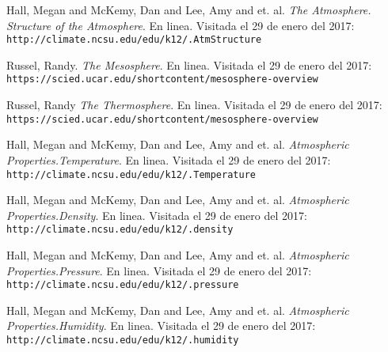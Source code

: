 \documentclass[12pt]{article}
\begin{document}
\newpage
\begin{thebibliography}{9}
Hall, Megan and McKemy, Dan and Lee, Amy and et. al.
\textit{The Atmosphere. Structure of the Atmosphere}. En linea. Visitada el 29 de enero del 2017:
\\\texttt{http://climate.ncsu.edu/edu/k12/.AtmStructure}
 
Russel, Randy.
\textit{The Mesosphere}. En linea. Visitada el 29 de enero del 2017:
\\\texttt{https://scied.ucar.edu/shortcontent/mesosphere-overview}
 
Russel, Randy
\textit{The Thermosphere}. En linea. Visitada el 29 de enero del 2017:
\\\texttt{https://scied.ucar.edu/shortcontent/mesosphere-overview}

Hall, Megan and McKemy, Dan and Lee, Amy and et. al.
\textit{Atmospheric Properties.Temperature}. En linea. Visitada el 29 de enero del 2017:
\\\texttt{http://climate.ncsu.edu/edu/k12/.Temperature}

Hall, Megan and McKemy, Dan and Lee, Amy and et. al.
\textit{Atmospheric Properties.Density}. En linea. Visitada el 29 de enero del 2017:
\\\texttt{http://climate.ncsu.edu/edu/k12/.density}

Hall, Megan and McKemy, Dan and Lee, Amy and et. al.
\textit{Atmospheric Properties.Pressure}. En linea. Visitada el 29 de enero del 2017:
\\\texttt{http://climate.ncsu.edu/edu/k12/.pressure}

Hall, Megan and McKemy, Dan and Lee, Amy and et. al.
\textit{Atmospheric Properties.Humidity}. En linea. Visitada el 29 de enero del 2017:
\\\texttt{http://climate.ncsu.edu/edu/k12/.humidity}

\end{thebibliography}
\end{document}

